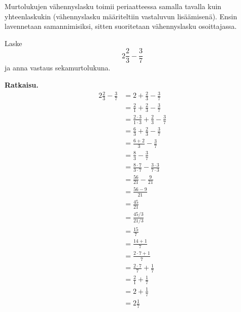 Murtolukujen vähennyslasku toimii periaatteessa samalla tavalla kuin yhteenlaskukin (vähennyslasku määriteltiin vastaluvun lisäämisenä). Ensin lavennetaan samannimisiksi, sitten suoritetaan vähennyslasku osoittajassa.



\newpage
\begin{esimerkki}
        Laske \[2\frac{2}{3} - \frac{3}{7}\] ja anna vastaus sekamurtolukuna.
        
        \textbf{Ratkaisu.}
        \begin{align*}
            2\frac{2}{3} - \frac{3}{7}&=2+\frac{2}{3} - \frac{3}{7}\\
            &=\frac{2}{1}+\frac{2}{3} - \frac{3}{7}\\
            &=\frac{2\cdot3}{1\cdot3}+\frac{2}{3}-\frac{3}{7}\\
            &=\frac{6}{3}+\frac{2}{3}-\frac{3}{7}\\
            &=\frac{6+2}{3} - \frac{3}{7} \\
            &=\frac{8}{3} - \frac{3}{7}\\
            &=\frac{8\cdot7}{3\cdot7} - \frac{3\cdot3}{7\cdot3}\\
            &=\frac{56}{21} - \frac{9}{21}\\
            &=\frac{56-9}{21}\\
            &=\frac{45}{21}\\
            &=\frac{45/3}{21/3}\\
            &=\frac{15}{7}\\
            &=\frac{14+1}{7}\\
            &=\frac{2\cdot7+1}{7}\\ %
            &=\frac{2\cdot7}{7}+\frac{1}{7}\\
            &=\frac{2}{1}+\frac{1}{7}\\
            &=2+\frac{1}{7}\\
            &=2\frac{1}{7}\\
        \end{align*}
    \end{esimerkki}

